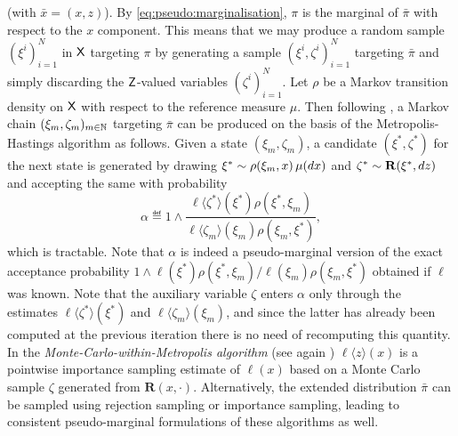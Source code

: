 (with $\bar{x} = (x, z)$). By \eqref{eq:pseudo:marginalisation}, $\pi$ is the marginal of $\bar{\pi}$ with respect to the $x$ component. This means that we may produce a random sample $(\xi^i)_{i = 1}^N$ in $\mathsf{X}$ targeting $\pi$ by generating a sample $(\xi^i, \zeta^i)_{i = 1}^N$ targeting $\bar{\pi}$ and simply discarding the $\mathsf{Z}$-valued variables $(\zeta^i)_{i = 1}^N$. Let $\rho$ be a Markov transition density on $\mathsf{X}$ with respect to the reference measure $\mu$. Then following \cite{andrieu:robert:2009}, a Markov chain $(\xi_m, \zeta_m)_{m \in \mathbb{N}}$ targeting $\bar{\pi}$ can be produced on the basis of the Metropolis-Hastings algorithm as follows. Given a state $(\xi_m, \zeta_m)$, a candidate $(\xi^\ast, \zeta^\ast)$ for the next state is generated by drawing $\xi^\ast \sim \rho(\xi_m, x) \, \mu(d x)$ and $\zeta^\ast \sim \mathbf{R}(\xi^\ast, d z)$ and accepting the same with probability 
$$
\alpha \eqdef 1 \wedge \frac{\ell \langle \zeta^\ast \rangle(\xi^\ast) \rho(\xi^\ast, \xi_m)}{\ell \langle \zeta_m \rangle (\xi_m) \rho(\xi_m, \xi^\ast)},  
$$
which is tractable. Note that $\alpha$ is indeed a pseudo-marginal version of the exact acceptance probability $1 \wedge \ell (\xi^\ast) \rho(\xi^\ast, \xi_m) / \ell (\xi_m) \rho(\xi_m, \xi^\ast)$ obtained if $\ell$ was known. Note that the auxiliary variable $\zeta$ enters $\alpha$ only through the estimates $\ell \langle \zeta^\ast \rangle (\xi^\ast)$ and $\ell \langle \zeta_m \rangle (\xi_m)$, and since the latter has already been computed at the previous iteration there is no need of recomputing this quantity. In the \emph{Monte-Carlo-within-Metropolis algorithm} (see again \cite{andrieu:robert:2009}) $\ell \langle z \rangle(x)$ is a pointwise importance sampling estimate of $\ell(x)$ based on a Monte Carlo sample $\zeta$ generated from $\mathbf{R}(x, \cdot)$. Alternatively, the extended distribution $\bar{\pi}$ can be sampled using rejection sampling or importance sampling, leading to consistent pseudo-marginal formulations of these algorithms as well. 

